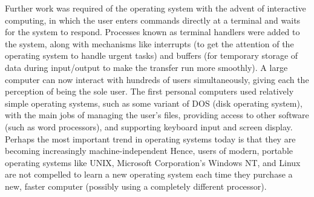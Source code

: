 \documentclass[a4paper, 12pt]{extarticle}
\begin{document}
Further work was required of the operating system with the advent of interactive
computing, in which the user enters commands directly at a terminal and waits
for the system to respond. Processes known as terminal handlers were added to
the system, along with mechanisms like interrupts (to get the attention of the
operating system to handle urgent tasks) and buffers (for temporary storage of
data during input/output to make the transfer run more smoothly). A large
computer can now interact with hundreds of users simultaneously, giving each the
perception of being the sole user. The first personal computers used relatively
simple operating systems, such as some variant of DOS (disk operating system),
with the main jobs of managing the user's files, providing access to other
software (such as word processors), and supporting keyboard input and screen
display. Perhaps the most important trend in operating systems today is that
they are becoming increasingly machine-independent Hence, users of modern,
portable operating systems like UNIX, Microsoft Corporation's Windows NT, and
Linux are not compelled to learn a new operating system each time they purchase
a new, faster computer (possibly using a completely different processor).
\end{document}
